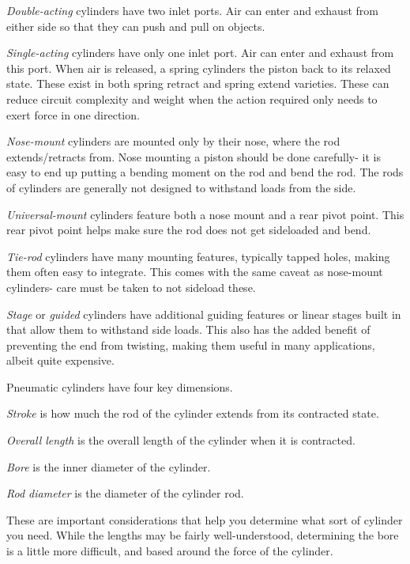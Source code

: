 \documentclass[10pt,letterpaper]{book}
\begin{document}
\begin{asparaenum}[a)]
	\item  \textit{Double-acting} cylinders have two inlet ports. Air can enter and exhaust from either side so that they can push and pull on objects.
	\item \textit{Single-acting} cylinders have only one inlet port. Air can enter and exhaust from this port. When air is released, a spring cylinders the piston back to its relaxed state. These exist in both spring retract and spring extend varieties. These can reduce circuit complexity and weight when the action required only needs to exert force in one direction.
	\item \textit{Nose-mount} cylinders are mounted only by their nose, where the rod extends/retracts from. Nose mounting a piston should be done carefully- it is easy to end up putting a bending moment on the rod and bend the rod. The rods of cylinders are generally not designed to withstand loads from the side.
	\item \textit{Universal-mount} cylinders feature both a nose mount and a rear pivot point. This rear pivot point helps make sure the rod does not get sideloaded and bend.
	\item \textit{Tie-rod} cylinders have many mounting features, typically tapped holes, making them often easy to integrate. This comes with the same caveat as nose-mount cylinders- care must be taken to not sideload these.
	\item \textit{Stage} or \textit{guided} cylinders have additional guiding features or linear stages built in that allow them to withstand side loads. This also has the added benefit of preventing the end from twisting, making them useful in many applications, albeit quite expensive.
\end{asparaenum}

Pneumatic cylinders have four key dimensions.
\begin{asparaenum}[a)]
	\item \textit{Stroke} is how much the rod of the cylinder extends from its contracted state.
	\item \textit{Overall length} is the overall length of the cylinder when it is contracted.
	\item \textit{Bore} is the inner diameter of the cylinder.
	\item \textit{Rod diameter} is the diameter of the cylinder rod.
\end{asparaenum}

These are important considerations that help you determine what sort of cylinder you need. While the lengths may be fairly well-understood, determining the bore is a little more difficult, and based around the force of the cylinder.
\end{document}
